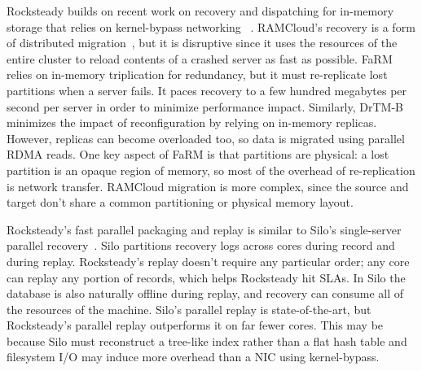Rocksteady builds on recent work on recovery and dispatching for
in-memory storage that relies on kernel-bypass networking
~\cite{mica,herd,billions,fasst-2016,rdma-guidelines,ix,arrakis,grappa}.  RAMCloud's
recovery is a form of distributed migration~\cite{ramcloud-recovery}, but
it is disruptive since it uses the resources of the entire cluster
to reload contents of a crashed server as fast as possible.
FaRM~\cite{farm-2014,farm-txns} relies on in-memory triplication for redundancy, but
it must re-replicate lost partitions when a server fails. It paces recovery to a
few hundred megabytes per second per server in order to minimize performance
impact. Similarly, DrTM-B~\cite{drtmb} minimizes the impact of reconfiguration by relying on in-memory replicas.
However, replicas can become overloaded too, so
data is migrated using parallel RDMA reads.
One key aspect of FaRM is that partitions are physical: a lost
partition is an opaque region of memory, so most of the overhead of
re-replication is network transfer. RAMCloud migration is more complex, since
the source and target don't share a common partitioning or physical memory layout.

Rocksteady's fast parallel packaging and replay is similar to Silo's
single-server parallel recovery~\cite{silo,silor}. Silo partitions recovery logs
across cores during record and during replay.  Rocksteady's replay doesn't
require any particular order; any core can replay any portion of records,
which helps Rocksteady hit SLAs.  In Silo the database is also
naturally offline during replay, and recovery can consume all of the resources
of the machine. Silo's parallel replay is state-of-the-art, but Rocksteady's
parallel replay outperforms it on far fewer cores. This may be because Silo
must reconstruct a tree-like index rather than a flat hash table and
filesystem I/O may induce more overhead than a NIC using kernel-bypass.

%
%


